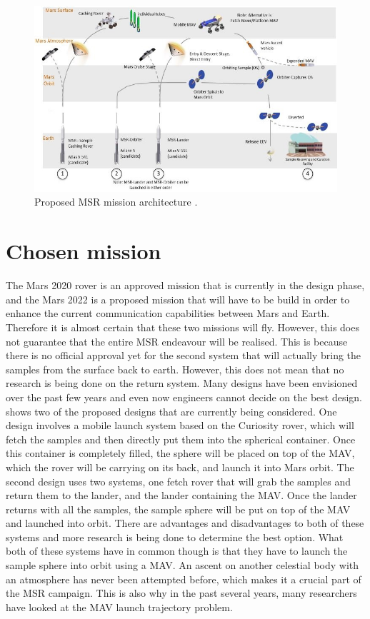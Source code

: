 \begin{figure}[H]
\centering
\includegraphics[width=0.75 \textwidth]{figures/heritage/proposedMSRmissionArchitecture_vaughan2016technology.jpg}
\caption{Proposed \ac{MSR} mission architecture \citep{vaughan2016technology}.}
\label{fig:proposedMSRmissionArchitecture_vaughan2016technology}
\end{figure}




\section{Chosen mission}
\label{sec:chosenMission}
The Mars 2020 rover is an approved mission that is currently in the design phase, and the Mars 2022 is a proposed mission that will have to be build in order to enhance the current communication capabilities between Mars and Earth. Therefore it is almost certain that these two missions will fly. However, this does not guarantee that the entire \ac{MSR} endeavour will be realised. This is because there is no official approval yet for the second system that will actually bring the samples from the surface back to earth. However, this does not mean that no research is being done on the return system. Many designs have been envisioned over the past few years and even now engineers cannot decide on the best design. \cite{shotwell2016drivers} shows two of the proposed designs that are currently being considered. One design involves a mobile launch system based on the Curiosity rover, which will fetch the samples and then directly put them into the spherical container. Once this container is completely filled, the sphere will be placed on top of the \ac{MAV}, which the rover will be carrying on its back, and launch it into Mars orbit. The second design uses two systems, one fetch rover that will grab the samples and return them to the lander, and the lander containing the \ac{MAV}. Once the lander returns with all the samples, the sample sphere will be put on top of the \ac{MAV} and launched into orbit. There are advantages and disadvantages to both of these systems and more research is being done to determine the best option. What both of these systems have in common though is that they have to launch the sample sphere into orbit using a \ac{MAV}. An ascent on another celestial body with an atmosphere has never been attempted before, which makes it a crucial part of the \ac{MSR} campaign. This is also why in the past several years, many researchers have looked at the \ac{MAV} launch trajectory problem. 

